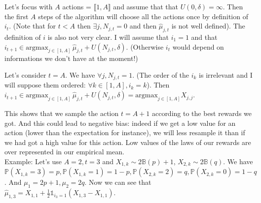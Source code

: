 \documentclass[a4paper]{article}
\newcommand{\wh}[1]{\widehat{#1}}
\begin{document}
Let's focus with $A$ actions = $\llbracket 1, A\rrbracket$ and assume that that $U(0, \delta) = \infty$. Then the first $A$ steps of the algorithm will
choose all the actions once by definition of $i_t$. (Note that for $t < A$ then $\exists j, N_{j, t} = 0$ and then $\wh\mu_{j, t}$ is not well defined).
The definition of $i$ is also not very clear. I will assume that $i_1 = 1$ and that
$i_{t+1} \in \text{argmax}_{j \in [1, A]}\, \wh\mu_{j,t} + U(N_{j,t}, \delta)$. (Otherwise $i_t$ would depend on informations we don't have at the moment!)

Let's consider $t = A$. We have $\forall j, N_{j, t} = 1$. (The order of the $i_k$ is irrelevant and I will suppose them ordered:
$\forall k \in [1, A], i_k = k$). Then $i_{t+1} \in \text{argmax}_{j \in [1, A]}\, \wh\mu_{j,t} + U(N_{j,t}, \delta) = \text{argmax}_{j \in [1, A]} X_{j, j}$.

This shows that we sample the action $t = A + 1$ according to the best rewards we got. And this could lead to negative bias: indeed
if we get a low value for an action (lower than the expectation for instance), we will less resample it than if we had got a high value
for this action. Low values of the laws of our rewards are over represented in our empirical mean.
\vspace{8px}\\
Example: Let's use $A = 2, t = 3$ and $X_{1, k} \sim 2\mathbb{B}(p) + 1$, $X_{2, k} \sim 2\mathbb{B}(q)$. We have
$\mathbb{P}(X_{1, k} = 3) = p, \mathbb{P}(X_{1, k} = 1) = 1-p, \mathbb{P}(X_{2, k} = 2) = q, \mathbb{P}(X_{2, k} = 0) = 1-q$.
And $\mu_1 = 2p + 1, \mu_2 = 2q$. Now we can see that $\wh\mu_{1, 3} = X_{1, 1} + \frac{1}{2}\mathds{1}_{i_3 = 1}(X_{1, 3} - X_{1, 1})$.
\end{document}
